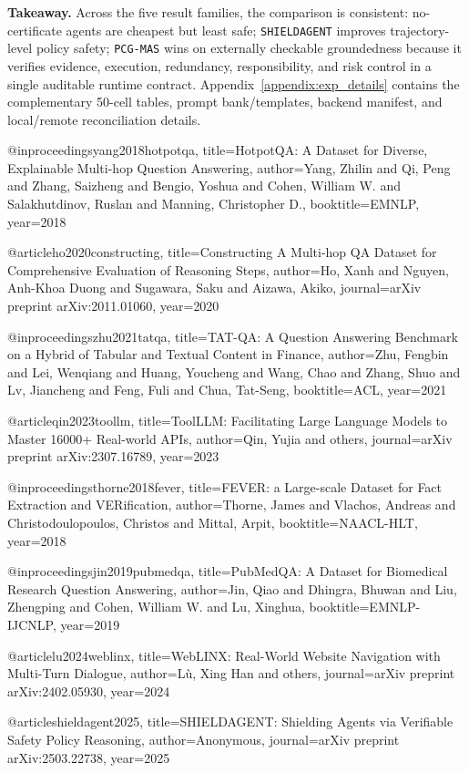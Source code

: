 \noindent\textbf{Takeaway.}
Across the five result families, the comparison is consistent: no-certificate agents are cheapest
but least safe; \texttt{SHIELDAGENT} improves trajectory-level policy safety; \texttt{PCG-MAS} wins
on externally checkable groundedness because it verifies evidence, execution, redundancy,
responsibility, and risk control in a single auditable runtime contract. Appendix~\ref{appendix:exp_details}
contains the complementary 50-cell tables, prompt bank/templates, backend manifest, and local/remote
reconciliation details.





@inproceedings{yang2018hotpotqa,
  title={HotpotQA: A Dataset for Diverse, Explainable Multi-hop Question Answering},
  author={Yang, Zhilin and Qi, Peng and Zhang, Saizheng and Bengio, Yoshua and Cohen, William W. and Salakhutdinov, Ruslan and Manning, Christopher D.},
  booktitle={EMNLP},
  year={2018}
}

@article{ho2020constructing,
  title={Constructing A Multi-hop QA Dataset for Comprehensive Evaluation of Reasoning Steps},
  author={Ho, Xanh and Nguyen, Anh-Khoa Duong and Sugawara, Saku and Aizawa, Akiko},
  journal={arXiv preprint arXiv:2011.01060},
  year={2020}
}

@inproceedings{zhu2021tatqa,
  title={TAT-QA: A Question Answering Benchmark on a Hybrid of Tabular and Textual Content in Finance},
  author={Zhu, Fengbin and Lei, Wenqiang and Huang, Youcheng and Wang, Chao and Zhang, Shuo and Lv, Jiancheng and Feng, Fuli and Chua, Tat-Seng},
  booktitle={ACL},
  year={2021}
}

@article{qin2023toollm,
  title={ToolLLM: Facilitating Large Language Models to Master 16000+ Real-world APIs},
  author={Qin, Yujia and others},
  journal={arXiv preprint arXiv:2307.16789},
  year={2023}
}

@inproceedings{thorne2018fever,
  title={FEVER: a Large-scale Dataset for Fact Extraction and VERification},
  author={Thorne, James and Vlachos, Andreas and Christodoulopoulos, Christos and Mittal, Arpit},
  booktitle={NAACL-HLT},
  year={2018}
}

@inproceedings{jin2019pubmedqa,
  title={PubMedQA: A Dataset for Biomedical Research Question Answering},
  author={Jin, Qiao and Dhingra, Bhuwan and Liu, Zhengping and Cohen, William W. and Lu, Xinghua},
  booktitle={EMNLP-IJCNLP},
  year={2019}
}

@article{lu2024weblinx,
  title={WebLINX: Real-World Website Navigation with Multi-Turn Dialogue},
  author={L{\`u}, Xing Han and others},
  journal={arXiv preprint arXiv:2402.05930},
  year={2024}
}

@article{shieldagent2025,
  title={SHIELDAGENT: Shielding Agents via Verifiable Safety Policy Reasoning},
  author={Anonymous},
  journal={arXiv preprint arXiv:2503.22738},
  year={2025}
}

